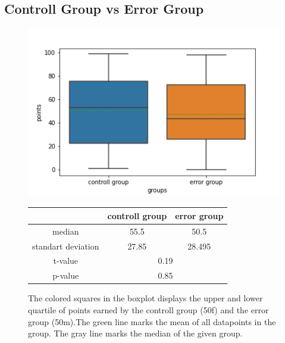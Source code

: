 \documentclass[runningheads]{llncs}
\begin{document}
\subsection{Controll Group vs Error Group}
\begin{figure}
    \begin{minipage}{0.45\textwidth}        
        \includegraphics[width=\textwidth]{code/generate/all.png}
        \caption{The colored squares in the boxplot displays
        the upper and lower quartile of points earned by the controll group (50f) and
        the error group (50m).The green line marks the mean of all datapoints in the group.
        The gray line marks the median  of the given group.} \label{fig7}
    \end{minipage}
\hfill
\begin{minipage}{0.45\textwidth}
\begin{tabular}[]{| c | c | c |}
        \hline
        & controll group & error group \\
        \hline
        median & 55.5&50.5 \\
        \hline
        standart deviation & 27.85&28.495 \\
        \hline
        t-value & \multicolumn{2}{c|}{0.19} \\
        \hline
        p-value & \multicolumn{2}{c|}{0.85} \\
        \hline            
\end{tabular}
\end{minipage}
\end{figure}
\end{document}
